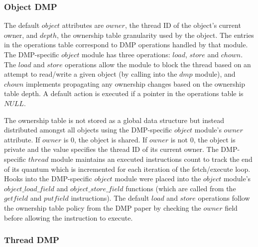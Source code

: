 \subsubsection{Object DMP}

The default $object$ attributes are $owner$, the thread ID of the
object's current owner, and $depth$, the ownership table granularity
used by the object.  The entries in the operations table correspond to
DMP operations handled by that module.  The DMP-specific $object$
module has three operations: $load$, $store$ and $chown$.  The $load$
and $store$ operations allow the module to block the thread based on
an attempt to read/write a given object (by calling into the $dmp$
module), and $chown$ implements propagating any ownership changes
based on the ownership table depth.  A default action is executed if a
pointer in the operations table is $NULL$.

The ownership table is not stored as a global data structure but
instead distributed amongst all objects using the DMP-specific
$object$ module's $owner$ attribute.  If $owner$ is $0$, the object is
shared.  If $owner$ is not $0$, the object is private and the value
specifies the thread ID of its current owner.  The DMP-specific
$thread$ module maintains an executed instructions count to track the
end of its quantum which is incremented for each iteration of the
fetch/execute loop.  Hooks into the DMP-specific $object$ module were
placed into the $object$ module's $object\_load\_field$ and
$object\_store\_field$ functions (which are called from the $getfield$
and $putfield$ instructions).  The default $load$ and $store$
operations follow the ownership table policy from the DMP paper by
checking the $owner$ field before allowing the instruction to execute.

\subsubsection{Thread DMP}

